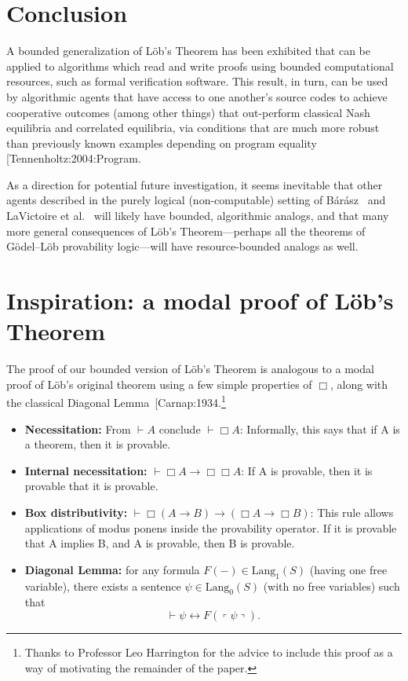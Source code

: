 \documentclass[jsl,reqno,bibay2]{asl}
\makeatletter
\numberwithin{equation}{section}
\theoremstyle{definition}
\newcommand{\proves}[1]{\underset{#1}{\vdash}}
\newcommand{\Lang}{\mathrm{Lang}}
\renewcommand{\iff}{\leftrightarrow}
\newcommand{\qquote}[1]{\left\ulcorner #1 \right\urcorner}
\renewcommand{\-}{^{-1}}
\def\citep{\@ifnextchar[{\@withp}{\@withoutp}}%
\def\@withp[#1]#2{[\!\!\citeauth{#2},~\citeyear[#1]{#2}]}%
\def\@withoutp#1{[\!\!\citeauth{#1},~\citeyear{#1}]}%
\makeatother
\begin{document}
\section{Conclusion}
A bounded generalization of L\"{o}b's Theorem has been exhibited that can be applied to algorithms which read and write proofs using bounded computational resources, such as formal verification software.  This result, in turn, can be used by algorithmic agents that have access to one another's source codes to achieve cooperative outcomes (among other things) that out-perform classical Nash equilibria and correlated equilibria, via conditions that are much more robust than previously known examples depending on program equality \citep{Tennenholtz:2004:Program}.

As a direction for potential future investigation, it seems inevitable that other agents described in the purely logical (non-computable) setting of  B\'{a}r\'{a}sz~\citeyear{Barasz:2014:robust} and LaVictoire et al.~\citeyear{LaVictoire:2014:program} will likely have bounded, algorithmic analogs, and that many more general consequences of L\"{o}b's Theorem---perhaps all the theorems of G\"{o}del--L\"{o}b provability logic---will have resource-bounded analogs as well.

\appendix

\section{Inspiration: a modal proof of L\"{o}b's Theorem}

The proof of our bounded version of L\"{o}b's Theorem is analogous to a modal proof of L\"{o}b's original theorem using a few simple properties of $\Box$, along with the classical Diagonal Lemma~\citep{Carnap:1934}.\footnote{Thanks to Professor Leo Harrington for the advice to include this proof as a way of motivating the remainder of the paper.}

\begin{itemize}
\item {\bf Necessitation:} From $\vdash A$ conclude $\vdash \Box A$: Informally, this says that if A is a theorem, then it is provable.
\item {\bf Internal necessitation:} $\vdash \Box A \rightarrow \Box \Box A$: If A is provable, then it is provable that it is provable.
\item {\bf Box distributivity:} $\vdash \Box (A \rightarrow B) \rightarrow (\Box A \rightarrow \Box B)$:  This rule allows applications of modus ponens inside the provability operator. If it is provable that A implies B, and A is provable, then B is provable.
\item {\bf Diagonal Lemma:} for any formula $F(-)\in\Lang_1(S)$ (having one free variable), there exists a sentence $\psi\in\Lang_0(S)$ (with no free variables) such that $$\proves{} \psi \iff F(\qquote\psi).$$  
\end{itemize}
\end{document}
